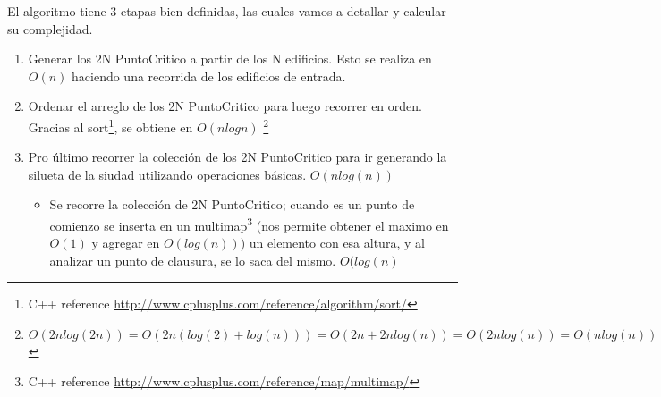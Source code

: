 El algoritmo tiene 3 etapas bien definidas, las cuales vamos a detallar y calcular su complejidad.

\begin{enumerate}[I]
	\item Generar los 2N PuntoCritico a partir de los N edificios. Esto se realiza en $O(n)$ haciendo una recorrida de los edificios de entrada.
	\item Ordenar el arreglo de los 2N PuntoCritico para luego recorrer en orden. Gracias al sort\footnote{C++ reference \url{http://www.cplusplus.com/reference/algorithm/sort/}}, se obtiene en $O(nlogn)$ \footnote{$O(2n log(2n)) = O(2n (log(2)+log(n))) = O(2n+2n log(n)) = O(2n log(n)) = O(n log(n)) $}
	\item Pro último recorrer la colección de los 2N PuntoCritico para ir generando la silueta de la siudad utilizando operaciones básicas. $O(n log(n))$
	\begin{itemize}
		\item Se recorre la colección de 2N PuntoCritico; cuando es un punto de comienzo se inserta en un multimap\footnote{C++ reference \url{http://www.cplusplus.com/reference/map/multimap/}} (nos permite obtener el maximo en $O(1)$ y agregar en $O(log(n))$) un elemento con esa altura, y al analizar un punto de clausura, se lo saca del mismo. $O(log(n)$
	\end{itemize}
\end{enumerate}